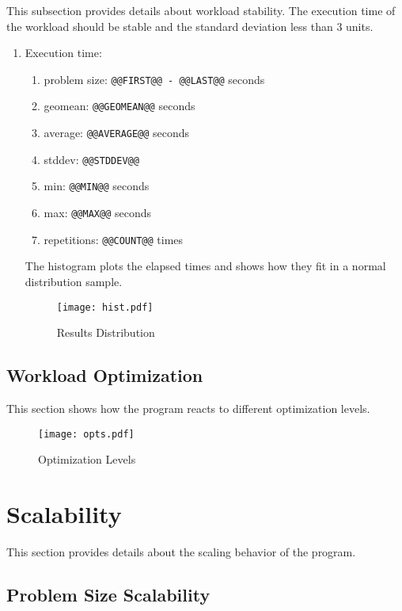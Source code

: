 \documentclass[a4paper]{article}
\begin{document}
This subsection provides details about workload stability. The execution time of the workload should be stable and the standard deviation less than 3 units.

\begin{enumerate}
\item Execution time:
\begin{enumerate}
\item problem size: {\tt @@FIRST@@ - @@LAST@@} seconds
\item geomean: {\tt @@GEOMEAN@@} seconds
\item average: {\tt @@AVERAGE@@} seconds
\item stddev: {\tt @@STDDEV@@}
\item min: {\tt @@MIN@@} seconds
\item max: {\tt @@MAX@@} seconds
\item repetitions: {\tt @@COUNT@@} times
\end{enumerate}

The histogram plots the elapsed times and shows how they fit in a normal distribution sample.

\begin{figure}[H]
\label{fig:histogram}
\centering
\texttt{[image: hist.pdf]}
\caption{Results Distribution}
\end{figure}

\end{enumerate}

\subsection{Workload Optimization}

This section shows how the program reacts to different optimization levels.

\begin{figure}[H]
\label{fig:optimizations}
\centering
\texttt{[image: opts.pdf]}
\caption{Optimization Levels}
\end{figure}

\section{Scalability}

This section provides details about the scaling behavior of the program.

\subsection{Problem Size Scalability}
\end{document}
